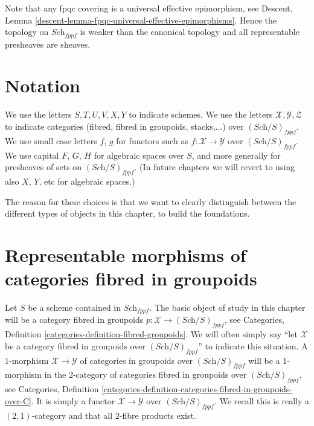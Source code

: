 \medskip\noindent
Note that any fpqc covering is a universal effective
epimorphism, see
Descent, Lemma \ref{descent-lemma-fpqc-universal-effective-epimorphisms}.
Hence the topology on $\textit{Sch}_{fppf}$
is weaker than the canonical topology and all representable presheaves
are sheaves.








\section{Notation}
\label{section-notation}

\noindent
We use the letters $S, T, U, V, X, Y$ to indicate schemes.
We use the letters $\mathcal{X}, \mathcal{Y}, \mathcal{Z}$ to indicate
categories (fibred, fibred in groupoids, stacks,...)
over $(\textit{Sch}/S)_{fppf}$. We use small case letters
$f$, $g$ for functors such as $f : \mathcal{X} \to \mathcal{Y}$
over $(\textit{Sch}/S)_{fppf}$.
We use capital $F$, $G$, $H$ for algebraic spaces over $S$, and more
generally for presheaves of sets on $(\textit{Sch}/S)_{fppf}$.
(In future chapters we will revert to using also $X$, $Y$, etc
for algebraic spaces.)

\medskip\noindent
The reason for these choices is that we want to clearly distinguish between
the different types of objects in this chapter, to build the foundations.








\section{Representable morphisms of categories fibred in groupoids}
\label{section-representable}

\noindent
Let $S$ be a scheme contained in $\textit{Sch}_{fppf}$.
The basic object of study in this chapter will be a
category fibred in groupoids
$p : \mathcal{X} \to (\textit{Sch}/S)_{fppf}$, see
Categories, Definition \ref{categories-definition-fibred-groupoids}.
We will often simply say ``let $\mathcal{X}$ be a category fibred
in groupoids over $(\textit{Sch}/S)_{fppf}$'' to indicate
this situation. A $1$-morphism $\mathcal{X} \to \mathcal{Y}$ of categories
in groupoids over $(\textit{Sch}/S)_{fppf}$ will be a $1$-morphism
in the $2$-category of categories fibred in groupoids over
$(\textit{Sch}/S)_{fppf}$, see Categories,
Definition \ref{categories-definition-categories-fibred-in-groupoids-over-C}.
It is simply a functor $\mathcal{X} \to \mathcal{Y}$ over
$(\textit{Sch}/S)_{fppf}$.
We recall this is really a $(2, 1)$-category and that all $2$-fibre products
exist.

